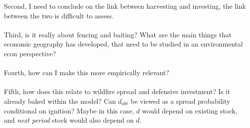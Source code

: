 \documentclass{article}
\begin{document}
Second, I need to conclude on the link between harvesting and investing, the link between the two is difficult to assess. \\\\

Third, is it really about fencing and baiting? What are the main things that economic geography has developed, that need to be studied in an environmental econ perspective? \\\\

Fourth, how can I make this more empirically relevant? 
\\\\
Fifth, how does this relate to wildfire spread and defensive investment? Is it already baked within the model? Can $d_{abt}$ be viewed as a spread probability conditional on ignition? Maybe in this case, $d$ would depend on existing stock, and \textit{next period} stock would also depend on $d$.


\newpage

\end{document}
